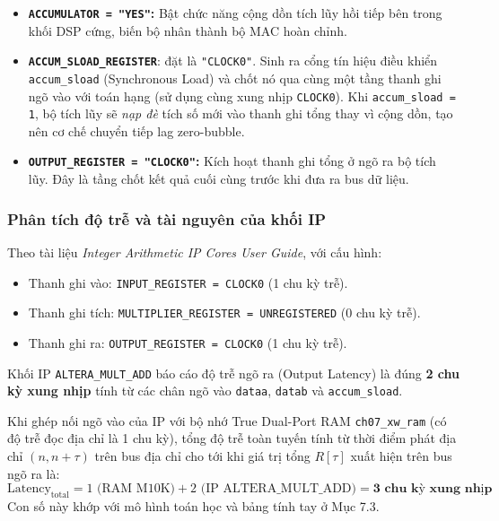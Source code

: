 \begin{itemize}[leftmargin=1.5em, itemsep=4pt]
    \item \textbf{\texttt{ACCUMULATOR = "YES"}:}
    Bật chức năng cộng dồn tích lũy hồi tiếp bên trong khối DSP cứng, biến bộ nhân thành bộ MAC hoàn chỉnh.
    
    \item \textbf{\texttt{ACCUM\_SLOAD\_REGISTER}}: đặt là \texttt{"CLOCK0"}.
    Sinh ra cổng tín hiệu điều khiển \texttt{accum\_sload} (Synchronous Load) và chốt nó qua cùng một tầng thanh ghi ngõ vào với toán hạng (sử dụng cùng xung nhịp \texttt{CLOCK0}). Khi \texttt{accum\_sload = 1}, bộ tích lũy sẽ \emph{nạp đè} tích số mới vào thanh ghi tổng thay vì cộng dồn, tạo nên cơ chế chuyển tiếp lag zero-bubble.
    
    \item \textbf{\texttt{OUTPUT\_REGISTER = "CLOCK0"}:}
    Kích hoạt thanh ghi tổng ở ngõ ra bộ tích lũy. Đây là tầng chốt kết quả cuối cùng trước khi đưa ra bus dữ liệu.
\end{itemize}

\subsubsection*{Phân tích độ trễ và tài nguyên của khối IP}
Theo tài liệu \emph{Integer Arithmetic IP Cores User Guide}, với cấu hình:
\begin{itemize}[leftmargin=1.5em, itemsep=2pt]
    \item Thanh ghi vào: \texttt{INPUT\_REGISTER = CLOCK0} (1 chu kỳ trễ).
    \item Thanh ghi tích: \texttt{MULTIPLIER\_REGISTER = UNREGISTERED} (0 chu kỳ trễ).
    \item Thanh ghi ra: \texttt{OUTPUT\_REGISTER = CLOCK0} (1 chu kỳ trễ).
\end{itemize}
Khối IP \texttt{ALTERA\_MULT\_ADD} báo cáo độ trễ ngõ ra (Output Latency) là đúng \textbf{2 chu kỳ xung nhịp} tính từ các chân ngõ vào \texttt{dataa}, \texttt{datab} và \texttt{accum\_sload}.

Khi ghép nối ngõ vào của IP với bộ nhớ True Dual-Port RAM \texttt{ch07\_xw\_ram} (có độ trễ đọc địa chỉ là 1 chu kỳ), tổng độ trễ toàn tuyến tính từ thời điểm phát địa chỉ $(n, n+\tau)$ trên bus địa chỉ cho tới khi giá trị tổng $R[\tau]$ xuất hiện trên bus ngõ ra là:
\begin{equation}
\text{Latency}_{\text{total}} = 1\text{ (RAM M10K)} + 2\text{ (IP ALTERA\_MULT\_ADD)} = \mathbf{3\text{ chu kỳ xung nhịp}}
\end{equation}
Con số này khớp với mô hình toán học và bảng tính tay ở Mục 7.3.

